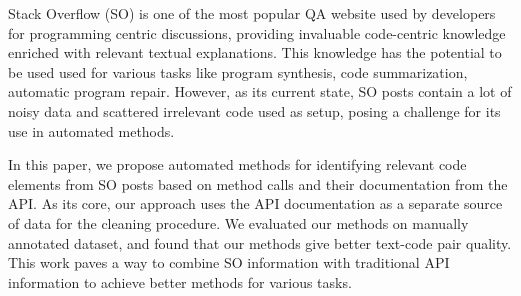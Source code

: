 Stack Overflow (SO) is one of the most popular QA website used by developers for programming centric discussions, providing invaluable code-centric knowledge enriched with relevant textual explanations. This knowledge has the potential to be used used for various tasks like program synthesis, code summarization, automatic program repair. However, as its current state, SO posts contain a lot of noisy data and scattered irrelevant code used as setup, posing a challenge for its use in automated methods. 


In this paper, we propose automated methods for identifying relevant code elements from SO posts based on method calls and their documentation from the API. 
As its core, our approach uses the API documentation as a separate source of data for the cleaning procedure.  
We evaluated our methods on manually annotated dataset, and found that our methods give better text-code pair quality. 
This work paves a way to combine SO information with traditional API information to achieve better methods for various tasks.
